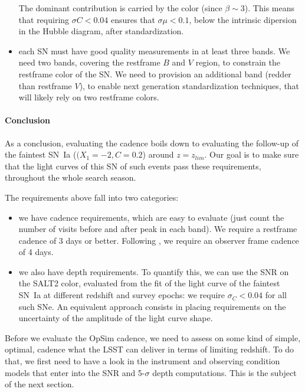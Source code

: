 \documentclass[\docopts]{\docclass}
\begin{document}
\begin{itemize}
  The dominant contribution is carried by the color (since
  $\beta \sim 3$). This means that requiring $\sigma C < 0.04$ ensures
  that $\sigma \mu < 0.1$, below the intrinsic dipersion in the Hubble
  diagram, after standardization.

\item each SN must have good quality measurements in at least three
  bands. We need two bands, covering the restframe $B$ and $V$ region,
  to constrain the restframe color of the SN. We need to provision an
  additional band (redder than restframe $V$), to enable next
  generation standardization techniques, that will likely rely on two
  restframe colors.
\end{itemize}


\paragraph{Conclusion} As a conclusion, evaluating the cadence boils
down to evaluating the follow-up of the faintest SN~Ia ($(X_1=-2,
C=0.2$) around $z = z_{lim}$. Our goal is to make sure that the light
curves of this SN of such events pass these requirements, throughout
the whole search season.

The requirements above fall into two categories: 
\begin{itemize}
\item we have  cadence requirements, which are easy  to evaluate (just
  count the number of visits before  and after peak in each band).  We
  require  a  restframe  cadence  of  3  days  or  better.   Following
  \cite{2014A&A...572A..80A}, we require an  observer frame cadence of
  4 days.

\item we also have depth requirements.  To quantify this, we can use
  the SNR on the SALT2 color, evaluated from the fit of the light
  curve of the faintest SN~Ia at different redshift and survey epochs:
  we require $\sigma_C < 0.04$ for all such SNe.  An equivalent
  approach consists in placing requirements on the uncertainty of the
  amplitude of the light curve shape.  
\end{itemize}


Before we evaluate the OpSim cadence, we need to assess on some kind
of simple, optimal, cadence what the LSST can deliver in terms of
limiting redshift. To do that, we first need to have a look in the
instrument and observing condition models that enter into the SNR and
5-$\sigma$ depth computations. This is the subject of the next
section.
\end{document}

